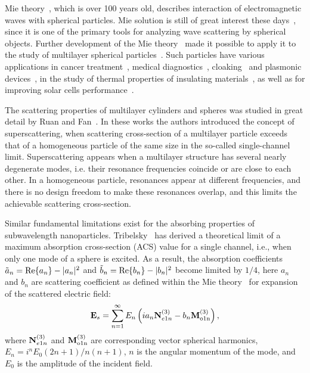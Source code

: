 \documentclass[aps,prl,twocolumn,showpacs,superscriptaddress,groupedaddress]{revtex4-1}  %
\begin{document}
\maketitle %

Mie theory~\cite{Mie-1908}, which is over 100 years old, describes
interaction of electromagnetic waves with spherical particles. Mie
solution is still of great interest these
days~\cite{Suzuki-2008,MacKowski-2012,Lerme-2000,Xu-2005,Li-2006,Gogoi-2010,Santiago-2011},
since it is one of the primary tools for analyzing wave scattering by
spherical objects. Further development of the Mie
theory~\cite{Yang-2003, Pena-scattnlay-2009} made it possible to apply
it to the study of multilayer spherical
particles~\cite{Sheehan-2013,Selmke-2012}.  Such particles have
various applications in cancer treatment~\cite{Zhang-2010,
  Hirsch-2003}, medical diagnostics~\cite{Allain-2002},
cloaking~\cite{Qui-2009, Semouchkina-2013, Ladutenko-2014} and
plasmonic devices~\cite{Martin-2013, Alu-2005}, in the study of
thermal properties of insulating materials~\cite{Xie-2013}, as well as
for improving solar cells performance~\cite{Kameya-2011,Mann-2011}.

The scattering properties of multilayer cylinders and spheres was
studied in great detail by Ruan and Fan~\cite{Fan-2010,Fan-2011}.  In
these works the authors introduced the concept of superscattering,
when scattering cross-section of a multilayer particle exceeds that of
a homogeneous particle of the same size in the so-called
single-channel limit. Superscattering appears when a multilayer
structure has several nearly degenerate modes, i.e. their resonance
frequencies coincide or are close to each other. In a homogeneous
particle, resonances appear at different frequencies, and there is no
design freedom to make these resonances overlap, and this limits the
achievable scattering cross-section.

Similar fundamental limitations exist for the absorbing properties of
subwavelength nanoparticles.  Tribelsky~\cite{Tribelsky-2011} has
derived a theoretical limit of a maximum absorption cross-section
(ACS) value for a single channel, i.e., when only one mode of a sphere
is excited.  As a result, the absorption coefficients $\tilde{a}_n=
{\rm Re}\{a_n\} - |a_n|^2 $ and $\tilde{b}_n= {\rm Re}\{b_n\} -
|b_n|^2 $ become limited by $1/4$, here $a_n$ and $b_n$ are scattering
coefficient as defined within the Mie theory~\cite{Bohren-1983} for
expansion of the scattered electric field:
$$ 
 {\rm \mathbf{E}}_s = \sum_{n=1}^{\infty} E_n
 \left(
   i a_n {\rm \mathbf{N}}_{e1n}^{(3)} - b_n{\rm\mathbf{M}_{o1n}^{(3)}}
 \right),
$$
where ${\rm \mathbf{N}}_{e1n}^{(3)}$ and ${\rm\mathbf{M}_{o1n}^{(3)}}$
are corresponding vector spherical harmonics,
$E_n=i^nE_0(2n+1)/n(n+1)$, $n$ is the angular momentum of the mode,
and $E_0$ is the amplitude of the incident field.
\end{document}
